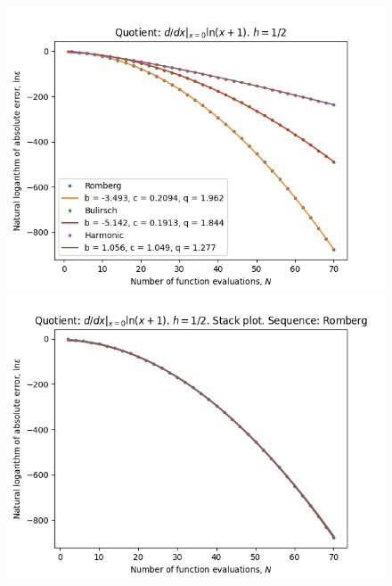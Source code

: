 \begin{figure}[H]
\centering
\begin{minipage}{0.45\textwidth}
\centering
\includegraphics[scale=0.45]{../results/diff_quot_plots/h_one_hp_trend.png}
\end{minipage}
\begin{minipage}{0.45\textwidth}
\centering
\includegraphics[scale=0.45]{../results/diff_quot_plots/h_one_hp_romberg_stack.png}
\end{minipage}
\end{figure}

